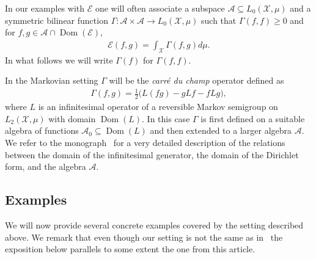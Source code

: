 \documentclass[a4paper]{amsart}
\theoremstyle{definition}
\theoremstyle{remark}
\numberwithin{equation}{section}
\newcommand{\calX}{\mathcal{X}}
\newcommand*{\calA}{\mathcal{A}}
\DeclareMathOperator{\Dom}{Dom} %
\newcommand*{\calE}{\mathcal{E}}
\begin{document}
In our examples with $\mathcal{E}$ one will often associate a subspace $\mathcal{A} \subseteq L_0(\calX,\mu)$ and a symmetric bilinear function $\Gamma \colon \calA\times \calA \to L_0(\mathcal{X},\mu)$ such that $\Gamma(f,f) \ge 0$ and for $f,g \in \calA \cap \Dom(\calE)$,
\begin{align}\label{eq:champ-form}
  \calE(f,g) = \int_\mathcal{X}\Gamma(f,g)d\mu.
\end{align}
In what follows we will write $\Gamma(f)$ for $\Gamma(f,f)$.


In the Markovian setting $\Gamma$ will be the \emph{carr\'e du champ} operator defined as
\begin{align}\label{eq:carre-du-champ}
  \Gamma(f,g) = \frac{1}{2}\Big(L(fg) - gLf - fLg\Big),
\end{align}
where $L$ is an infinitesimal operator of a reversible Markov semigroup on $L_2(\calX,\mu)$ with domain $\Dom(L)$. In this case  $\Gamma$ is first defined on a suitable algebra of functions $\calA_0 \subseteq \Dom(L)$ and then extended to a larger algebra $\calA$. We refer to the monograph~\cite{MR3155209} for a very detailed description of the relations between the domain of the infinitesimal generator, the domain of the Dirichlet form, and the algebra $\mathcal{A}$. 


\subsection{Examples}

We will now provide several concrete examples covered by the setting described above.
We remark that even though our setting is not the same as in~\cite{MR3078024} the exposition below parallels to some extent the one from this article.
\end{document}
